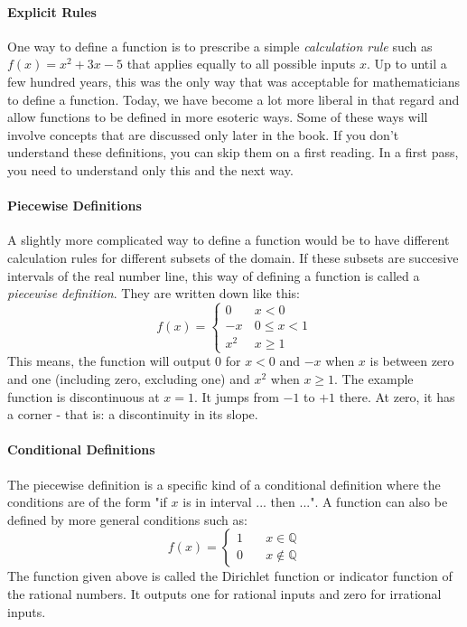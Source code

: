 \paragraph{Explicit Rules}
One way to define a function is to prescribe a simple \emph{calculation rule} such as $f(x) = x^2 + 3 x - 5$ that applies equally to all possible inputs $x$. Up to until a few hundred years, this was the only way that was acceptable for mathematicians to define a function. Today, we have become a lot more liberal in that regard and allow functions to be defined in more esoteric ways. Some of these ways will involve concepts that are discussed only later in the book. If you don't understand these definitions, you can skip them on a first reading. In a first pass, you need to understand only this and the next way.

\paragraph{Piecewise Definitions}
A slightly more complicated way to define a function would be to have different calculation rules for different subsets of the domain. If these subsets are succesive intervals of the real number line, this way of defining a function is called a \emph{piecewise definition}. They are written down like this:
\begin{equation}
f(x) = 
\begin{cases} 
 0 \quad& x < 0 \\
 -x     & 0   \leq x < 1 \\
 x^2    & x \geq 1
\end{cases}
\end{equation}
This means, the function will output $0$ for $x < 0$ and $-x$ when $x$ is between zero and one (including zero, excluding one) and $x^2$ when $x \geq 1$. The example function is discontinuous at $x=1$. It jumps from $-1$ to $+1$ there. At zero, it has a corner - that is: a discontinuity in its slope.


\paragraph{Conditional Definitions}
The piecewise definition is a specific kind of a conditional definition where the conditions are of the form "if $x$ is in interval ... then ...". A function can also be defined by more general conditions such as:
\begin{equation}
f(x) = 
\begin{cases} 
 1 \quad& x \in    \mathbb{Q} \\
 0      & x \notin \mathbb{Q}
\end{cases}
\end{equation}
The function given above is called the Dirichlet function or indicator function of the rational numbers. It outputs one for rational inputs and zero for irrational inputs.

